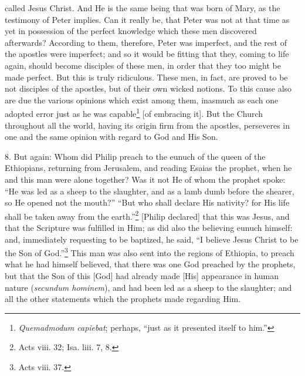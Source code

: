 called Jesus Christ. And He is the same being that was born of Mary, as the testimony of Peter implies. Can it really be, that Peter was not at that time as yet in possession of the perfect knowledge which these men discovered afterwards? According to them, therefore, Peter was imperfect, and the rest of the apostles were imperfect; and so it would be fitting that they, coming to life again, should become disciples of these men, in order that they too might be made perfect. But this is truly ridiculous. These men, in fact, are proved to be not disciples of the apostles, but of their own wicked notions. To this cause also are due the various opinions which exist among them, inasmuch as each one adopted error just as he was capable\footnote{\emph{Quemadmodum capiebat}; perhaps, “just as it presented itself to him.”} [of embracing it]. But the Church throughout all the world, having its origin firm from the apostles, perseveres in one and the same opinion with regard to God and His Son.

8. But again: Whom did Philip preach to the eunuch of the queen of the Ethiopians, returning from Jerusalem, and reading Esaias the prophet, when he and this man were alone together? Was it not He of whom the prophet spoke: “He was led as a sheep to the slaughter, and as a lamb dumb before the shearer, so He opened not the mouth?” “But who shall declare His nativity? for His life shall be taken away from the earth.”\footnote{Acts viii. 32; Isa. liii. 7, 8.} [Philip declared] that this was Jesus, and that the Scripture was fulfilled in Him; as did also the believing eunuch himself: and, immediately requesting to be baptized, he said, “I believe Jesus Christ to be the Son of God.”\footnote{Acts viii. 37.} This man was also sent into the regions of Ethiopia, to preach what he had himself believed, that there was one God preached by the prophets, but that the Son of this [God] had already made [His] appearance in human nature (\emph{secundum hominem}), and had been led as a sheep to the slaughter; and all the other statements which the prophets made regarding Him.

